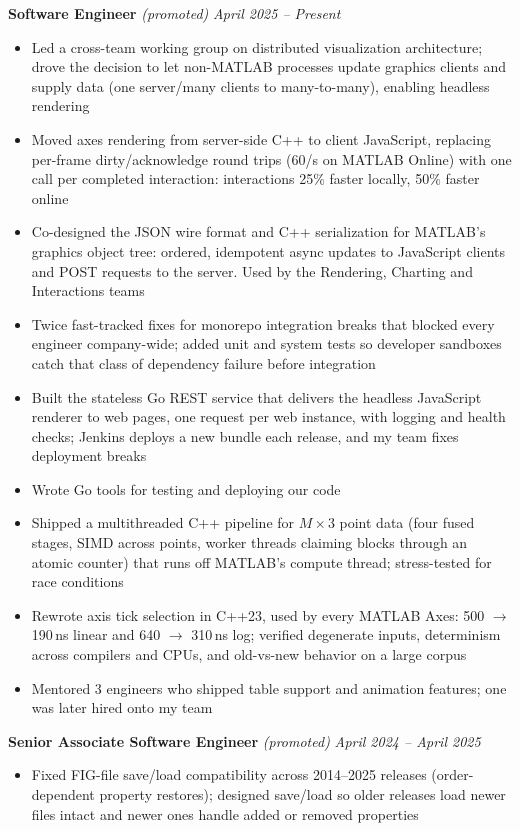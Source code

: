 \documentclass{article}
\begin{document}
{\large \textbf{Software Engineer}} \textit{(promoted)} \hfill \textit{April 2025 -- Present}
\begin{itemize}[leftmargin=*]
    \item Led a cross-team working group on distributed visualization architecture; drove the decision to let non-MATLAB processes update graphics clients and supply data (one server\slash many clients to many-to-many), enabling headless rendering
    \item Moved axes rendering from server-side C++ to client JavaScript, replacing per-frame dirty/acknowledge round trips (60/s on MATLAB Online) with one call per completed interaction: interactions 25\% faster locally, 50\% faster online
    \item Co-designed the JSON wire format and C++ serialization for MATLAB's graphics object tree: ordered, idempotent async updates to JavaScript clients and POST requests to the server. Used by the Rendering, Charting and Interactions teams
    \item Twice fast-tracked fixes for monorepo integration breaks that blocked every engineer company-wide; added unit and system tests so developer sandboxes catch that class of dependency failure before integration
    \item Built the stateless Go REST service that delivers the headless JavaScript renderer to web pages, one request per web instance, with logging and health checks; Jenkins deploys a new bundle each release, and my team fixes deployment breaks
    \item Wrote Go tools for testing and deploying our code
    \item Shipped a multithreaded C++ pipeline for $M \times 3$ point data (four fused stages, SIMD across points, worker threads claiming blocks through an atomic counter) that runs off MATLAB's compute thread; stress-tested for race conditions
    \item Rewrote axis tick selection in C++23, used by every MATLAB Axes: 500 $\to$ 190\,ns linear and 640 $\to$ 310\,ns log; verified degenerate inputs, determinism across compilers and CPUs, and old-vs-new behavior on a large corpus
    \item Mentored 3 engineers who shipped table support and animation features; one was later hired onto my team
\end{itemize}

{\large \textbf{Senior Associate Software Engineer}} \textit{(promoted)} \hfill \textit{April 2024 -- April 2025}
\begin{itemize}[leftmargin=*]
    \item Fixed FIG-file save/load compatibility across 2014--2025 releases (order-dependent property restores); designed save/load so older releases load newer files intact and newer ones handle added or removed properties
\end{itemize}
\end{document}
